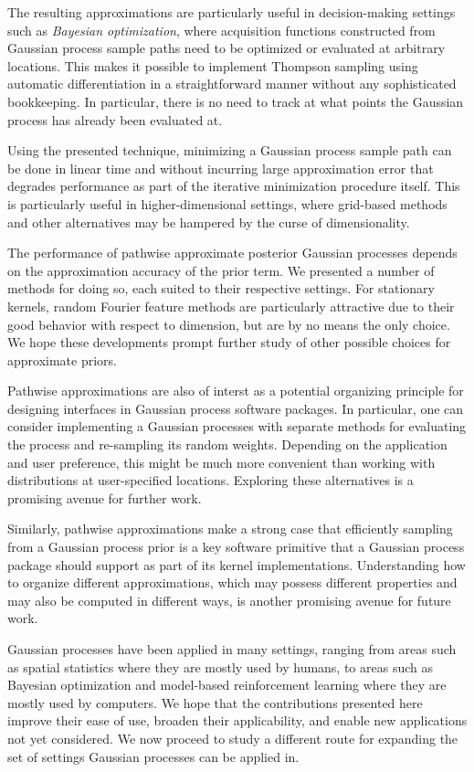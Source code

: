 \documentclass[11pt]{book}
\begin{document}
The resulting approximations are particularly useful in decision-making settings such as \emph{Bayesian optimization}, where acquisition functions constructed from Gaussian process sample paths need to be optimized or evaluated at arbitrary locations.
This makes it possible to implement Thompson sampling using automatic differentiation in a straightforward manner without any sophisticated bookkeeping.
In particular, there is no need to track at what points the Gaussian process has already been evaluated at.

Using the presented technique, minimizing a Gaussian process sample path can be done in linear time and without incurring large approximation error that degrades performance as part of the iterative minimization procedure itself.
This is particularly useful in higher-dimensional settings, where grid-based methods and other alternatives may be hampered by the curse of dimensionality.

The performance of pathwise approximate posterior Gaussian processes depends on the approximation accuracy of the prior term.
We presented a number of methods for doing so, each suited to their respective settings.
For stationary kernels, random Fourier feature methods are particularly attractive due to their good behavior with respect to dimension, but are by no means the only choice.
We hope these developments prompt further study of other possible choices for approximate priors.

Pathwise approximations are also of interst as a potential organizing principle for designing interfaces in Gaussian process software packages.
In particular, one can consider implementing a Gaussian processes with separate methods for evaluating the process and re-sampling its random weights.
Depending on the application and user preference, this might be much more convenient than working with distributions at user-specified locations.
Exploring these alternatives is a promising avenue for further work.

Similarly, pathwise approximations make a strong case that efficiently sampling from a Gaussian process prior is a key software primitive that a Gaussian process package should support as part of its kernel implementations. 
Understanding how to organize different approximations, which may possess different properties and may also be computed in different ways, is another promising avenue for future work.

Gaussian processes have been applied in many settings, ranging from areas such as spatial statistics where they are mostly used by humans, to areas such as Bayesian optimization and model-based reinforcement learning where they are mostly used by computers.
We hope that the contributions presented here improve their ease of use, broaden their applicability, and enable new applications not yet considered.
We now proceed to study a different route for expanding the set of settings Gaussian processes can be applied in.
\end{document}

